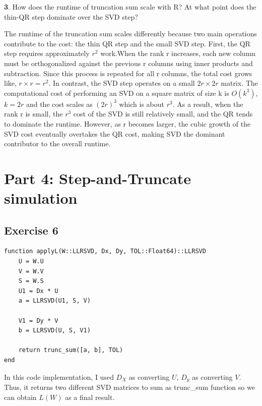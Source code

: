 \documentclass[11pt]{article}
\begin{document}
\vspace{1.5em}

\textbf{3}. How does the runtime of truncation sum scale with R? At what point does the thin-QR step dominate over the SVD step?

\vspace{0.8em}

The runtime of the truncation sum scales differently because two main operations contribute to the cost: the thin QR step and the small SVD step. First, the QR step requires approximately $r^2$ work.When the rank r increases, each new column must be orthogonalized against the previous r columns using inner products and subtraction. Since this process is repeated for all r columns, the total cost grows like, $ r \times r = r^2$. In contrast, the SVD step operates on a small $ 2r \times 2r$ matrix. The computational cost of performing an SVD on a square matrix of size k is $O(k^3)$, $k = 2r$ and the cost scales as $(2r)^3$ which is about $r^3$. As a result, when the rank r is small, the $r^3$ cost of the SVD is still relatively small, and the QR tends to dominate the runtime. However, as r becomes larger, the cubic growth of the SVD cost eventually overtakes the QR cost, making SVD the dominant contributor to the overall runtime.

\section*{Part 4: Step-and-Truncate simulation}
\subsection*{Exercise 6}
\begin{lstlisting}
function applyL(W::LLRSVD, Dx, Dy, TOL::Float64)::LLRSVD
    U = W.U
    V = W.V
    S = W.S
    U1 = Dx * U
    a = LLRSVD(U1, S, V)

    V1 = Dy * V
    b = LLRSVD(U, S, V1)

    return trunc_sum([a, b], TOL)
end

\end{lstlisting}
In this code implementation, I used $D_X$ as converting $U$, $D_y$ as converting $V$. Thus, it returns two different SVD matrices to sum as trunc\_sum function so we can obtain $L(W)$ as a final result.

\vspace{1.5em}
\end{document}
